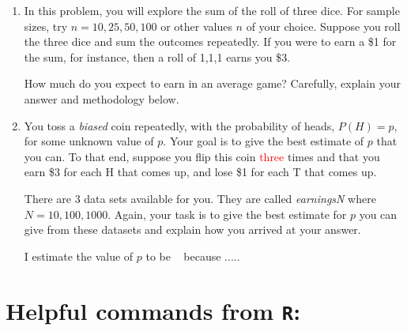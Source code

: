 \documentclass{report}
\begin{document}
\begin{enumerate}

\item In this problem, you will explore the sum of the roll of three dice.
For sample sizes, try $n = 10, 25, 50, 100$ or other values $n$ of your choice.
Suppose you roll the three dice and sum the outcomes repeatedly.  If you
were to earn a \$1 for the sum, for instance, then a roll of 1,1,1 earns you
\$3. 

How much do you expect to earn in an average game?
Carefully, explain your answer and methodology below.


%
%
%
%
%
%
%

\newpage

\item  You toss a \emph{biased} coin repeatedly, with the probability of
heads, $P (H) = p$, for some unknown value of $p$.  Your goal is to
give the best estimate of $p$ that you can.  To that end, suppose you
flip this coin \textcolor{red}{three} times and that you earn \$3 for each H that comes up, 
and lose \$1 for each T that comes up.

There are 3 data sets available for you.  They are called
\emph{earningsN} where $N = 10, 100, 1000$.
Again, your task is to give the best estimate for $p$ you can give from
these datasets and explain how you arrived at your answer.

\smallskip

I estimate the value of $p$ to be \underline{\hskip 2cm} ~ because .....


\end{enumerate}


\newpage


\section*{Helpful commands from {\tt R}:}
\end{document}
